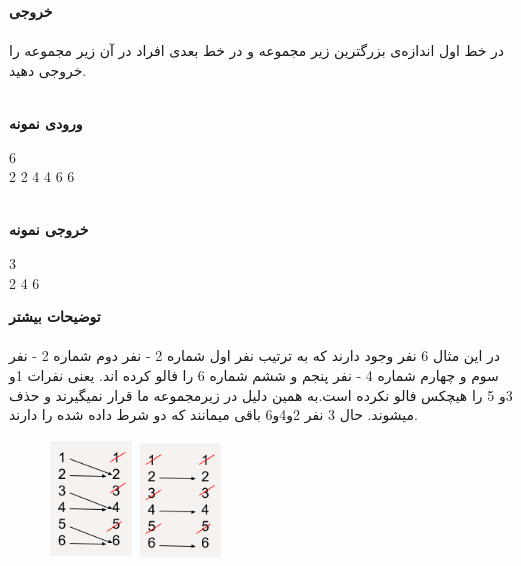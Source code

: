 \documentclass[]{article}
\newcommand{\inputsample}[1]{
    ~\\
    \textbf{ورودی نمونه}
    ~\\
    \begin{tcolorbox}[breakable,boxrule=0pt]
        \begin{latin}
            \large{
                #1
            }
        \end{latin}
    \end{tcolorbox}
}
\newcommand{\outputsample}[1]{
    ~\\
    \textbf{خروجی نمونه}

    \begin{tcolorbox}[breakable,boxrule=0pt]
        \begin{latin}
            \large{
                #1
            }
        \end{latin}
    \end{tcolorbox}
}
\begin{document}
\textbf{خروجی}\\\\
در خط اول اندازه‌ی بزرگترین زیر مجموعه و در خط بعدی افراد در آن زیر مجموعه‌ را خروجی دهید.

\newpage
\inputsample{
6\\
2 2 4 4 6 6
}
\outputsample{
3\\
2 4 6
}
\vspace{1cm}
\textbf{توضیحات بیشتر}\\\\
در این مثال 6 نفر وجود دارند که به ترتیب نفر اول  شماره 2 - نفر دوم شماره 2 - نفر سوم و چهارم شماره 4 - نفر پنجم و ششم شماره 6 را فالو کرده اند. یعنی نفرات 1و 3و 5 را هیچکس فالو نکرده است.به همین دلیل در زیرمجموعه ما قرار نمیگیرند و حذف میشوند. حال 3 نفر 2و4و6 باقی میمانند که دو شرط داده شده را دارند.
\begin{figure}[h]
\centering
\includegraphics[width=0.2\textwidth]{social1.png}
\includegraphics[width=0.2\textwidth]{social2.png}
\end{figure}
\end{document}
